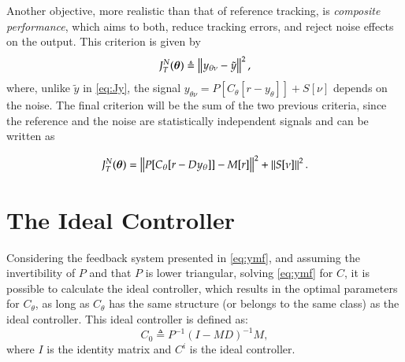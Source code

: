 Another objective, more realistic than that of reference tracking, is \textit{composite performance}, which aims to both, reduce tracking errors, and reject noise effects on the output. This criterion is given by
\begin{equation}
   J_T^N(\bm{\theta}) \triangleq \left\lVert y_{\theta\nu} - \tilde{y} \right\rVert^2,
   \label{eq:JT}
\end{equation}
where, unlike $\tilde{y}$ in \eqref{eq:Jy}, the signal $y_{\theta\nu}= P[C_\theta[r-y_\theta]] + S[\nu]$ depends on the noise. The final criterion will be the sum of the two previous criteria, since the reference and the noise are statistically independent signals and can be written as

\begin{equation}
   J_T^N(\bm{\theta}) = \left\lVert P[C_\theta[r-Dy_\theta]] - M[r] \right\rVert^{2} + \left\lVert S[\nu] \right\rVert^2.
   \label{eq:}
\end{equation}






\section{The Ideal Controller}%
\label{sec:ideal_controller}

Considering the feedback system presented in \eqref{eq:ymf}, and assuming the invertibility of $P$ and that $P$ is lower triangular, solving \eqref{eq:ymf} for $C$, it is possible to calculate the ideal controller, which results in the optimal parameters for $C_\theta$, as long as $C_\theta$ has the same structure (or belongs to the same class) as the ideal controller. This ideal controller is defined as:
\begin{equation}
   C_0 \triangleq P^{-1}(I-MD)^{-1}M,
\label{eq:IdealController}
\end{equation}
where $I$ is the identity matrix and $C^{i}$ is the ideal controller.

